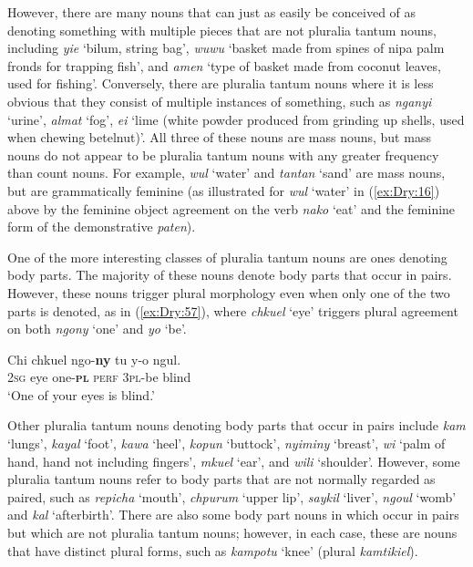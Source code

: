 \documentclass[output=collectionpaper]{langsci/langscibook}
\begin{document}
However, there are many nouns that can just as easily be conceived of as denoting something with multiple pieces that are not pluralia tantum nouns, including \textit{yie} `bilum, string bag', \textit{wuwu} `basket made from spines of nipa palm fronds for trapping fish', and \textit{amen} `type of basket made from coconut leaves, used for fishing'. Conversely, there are pluralia tantum nouns where it is less obvious that they consist of multiple instances of something, such as \textit{nganyi} `urine',  \textit{almat} `fog', \textit{ei} `lime (white powder produced from grinding up shells, used when chewing betelnut)'. All three of these nouns are mass nouns, but mass nouns do not appear to be pluralia tantum nouns with any greater frequency than count nouns. For example, \textit{wul} `water' and \textit{tantan} `sand' are mass nouns, but are grammatically feminine (as illustrated for \textit{wul} `water' in (\ref{ex:Dry:16}) above by the feminine object agreement on the verb \textit{nako} `eat' and the feminine form of the demonstrative \textit{paten}).

One of the more interesting classes of pluralia tantum nouns are ones denoting body parts. The majority of these nouns denote body parts that occur in pairs. However, these nouns trigger plural morphology even when only one of the two parts is denoted, as in (\ref{ex:Dry:57}), where \textit{chkuel} `eye' triggers plural agreement on both \textit{ngony} `one' and \textit{yo} `be'.

\ea  \label{ex:Dry:57}
\gll Chi	chkuel	ngo-\textbf{ny}	tu	y-o	ngul.\\
\textsc{2sg} eye one-\textbf{\textsc{pl}} \textsc{perf} \textsc{3pl}-be blind\\
\glt `One of your eyes is blind.'
\z

Other pluralia tantum nouns denoting body parts that occur in pairs include \textit{kam} `lungs', \textit{kayal} `foot', \textit{kawa} `heel', \textit{kopun} `buttock', \textit{nyiminy} `breast', \textit{wi} `palm of hand, hand not including fingers', \textit{mkuel} `ear', and \textit{wili} `shoulder'. However, some pluralia tantum nouns refer to body parts that are not normally regarded as paired, such as \textit{repicha} `mouth', \textit{chpurum} `upper lip', \textit{saykil} `liver', \textit{ngoul} `womb' and \textit{kal} `afterbirth'. There are also some body part nouns in  which occur in pairs but which are not pluralia tantum nouns; however, in each case, these are nouns that have distinct plural forms, such as \textit{kampotu} `knee' (plural \textit{kamtikiel}).
\end{document}
